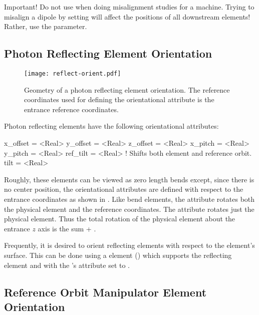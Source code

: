 Important! Do not use  when doing misalignment studies for a machine. Trying to misalign
a dipole by setting  will affect the positions of all downstream elements! Rather, use the
 parameter.

\subsection{Photon Reflecting Element Orientation}
\label{s:photon.orient}

\begin{figure}[ht]
  \centering
  \texttt{[image: reflect-orient.pdf]}
  \caption[Geometry of a photon reflecting element orientation]{
Geometry of a photon reflecting element orientation.  The reference coordinates used for defining
the orientational attribute is the entrance reference coordinates.  }
  \label{f:reflect.orient}
\end{figure}

Photon reflecting elements have the following orientational attributes:
\begin{example}
  x_offset = <Real>
  y_offset = <Real>
  z_offset = <Real>
  x_pitch  = <Real>
  y_pitch  = <Real>
  ref_tilt = <Real>    ! Shifts both element and reference orbit.
  tilt     = <Real>    
\end{example}
Roughly, these elements can be viewed as zero length bends except, since there is no center
position, the orientational attributes are defined with respect to the entrance coordinates as shown
in . Like bend elements, the  attribute rotates both the physical
element and the reference coordinates.  The  attribute rotates just the physical
element. Thus the total rotation of the physical element about the entrance $z$ axis is the sum
 + .

Frequently, it is desired to orient reflecting elements with respect to the element's surface. This
can be done using a  element () which supports the reflecting element and
with the 's  attribute set to .

\subsection{Reference Orbit Manipulator Element Orientation}
\label{s:manip.orient}

